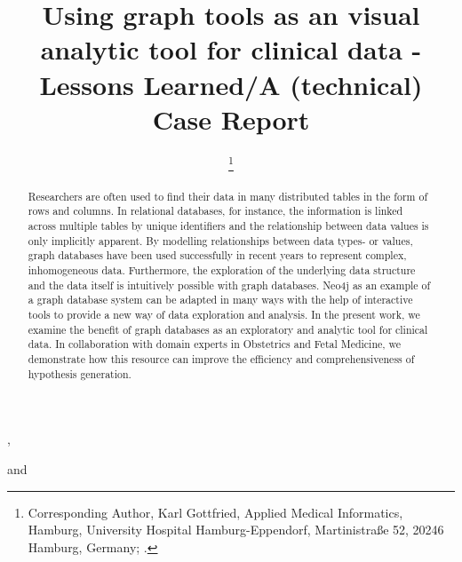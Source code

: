 \documentclass[aac]{iosart2x}
\begin{document}
\begin{frontmatter}

{\centering \title{Using graph tools as an visual analytic tool for clinical data - 
Lessons Learned/A (technical) Case Report
}}


\author[A]{ %
\thanks{Corresponding Author, Karl Gottfried, Applied Medical Informatics, Hamburg, University Hospital Hamburg-Eppendorf, Martinistraße 52, 20246 Hamburg, Germany;  .}},
\author[A]{ }
and
\author[A]{ }
\address[A]{Applied Medical Informatics, , Germany, ,
}
\address[B]{Department first, ,
Abbreviate US states, }


\begin{abstract}

Researchers are often used to find their data in many distributed tables in the form of rows and columns. In relational databases, for instance, the information is linked across multiple tables by unique identifiers and the relationship between data values is only implicitly apparent. By modelling relationships between data types- or values, graph databases have been used successfully in recent years to represent complex, inhomogeneous data. Furthermore, the exploration of the underlying data structure and the data itself is intuitively possible with graph databases. Neo4j as an example of a graph database system can be adapted in many ways with the help of interactive tools to provide a new way of data exploration and analysis. In the present work, we examine the benefit of graph databases as an exploratory and analytic tool for clinical data. In collaboration with domain experts in Obstetrics and Fetal Medicine, we demonstrate how this resource can improve the efficiency and comprehensiveness of hypothesis generation.
\end{abstract}

\begin{keyword}
\end{keyword}

\end{frontmatter}
\end{document}
